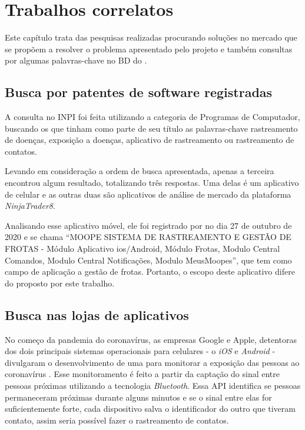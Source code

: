 \chapter{Trabalhos correlatos}\label{chp:correlatos}

Este capítulo trata das pesquisas realizadas procurando soluções no mercado que se propõem a resolver o problema apresentado pelo projeto e também consultas por algumas palavras-chave no BD do .

\section{Busca por patentes de software registradas}\label{sec:inpi}
A consulta no INPI foi feita utilizando a categoria de Programas de Computador, buscando os que tinham como parte de seu título as palavras-chave rastreamento de doenças, exposição a doenças, aplicativo de rastreamento ou rastreamento de contatos.

Levando em consideração a ordem de busca apresentada, apenas a terceira encontrou algum resultado, totalizando três respostas. Uma delas é um aplicativo de celular e as outras duas são aplicativos de análise de mercado da plataforma \textit{NinjaTrader8}.

Analisando esse aplicativo móvel, ele foi registrado por \textcite{moope} no dia 27 de outubro de 2020 e se chama “MOOPE SISTEMA DE RASTREAMENTO E GESTÃO DE FROTAS - Módulo Aplicativo ios/Android, Módulo Frotas, Modulo Central Comandos, Modulo Central Notificações, Modulo MeusMoopes”, que tem como campo de aplicação a gestão de frotas. Portanto, o escopo deste aplicativo difere do proposto por este trabalho.

\section{Busca nas lojas de aplicativos}\label{sec:mercado}
No começo da pandemia do coronavírus, as empresas Google e Apple, detentoras dos dois principais sistemas operacionais para celulares - o \textit{iOS} e \textit{Android} - divulgaram o desenvolvimento de uma  para monitorar a exposição das pessoas ao coronavírus \cite{GoogleApple2020}. Esse monitoramento é feito a partir da captação do sinal entre pessoas próximas utilizando a tecnologia \textit{Bluetooth}. Essa API identifica se pessoas permaneceram próximas durante alguns minutos e se o sinal entre elas for suficientemente forte, cada dispositivo salva o identificador do outro que tiveram contato, assim seria possível fazer o rastreamento de contatos.

